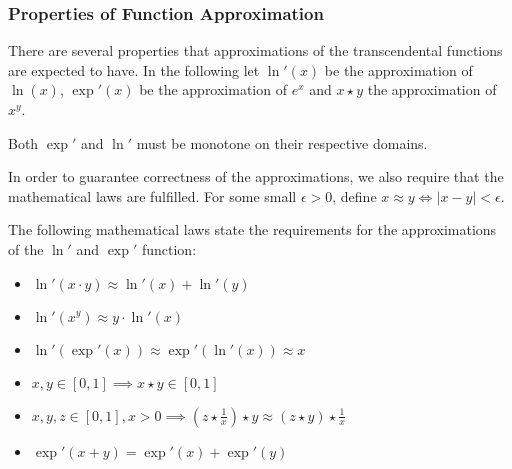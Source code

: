 \subsubsection{Properties of Function Approximation}
\label{sec:prop-funct-appr-1}

There are several properties that approximations of the transcendental functions
are expected to have. In the following let $\ln'(x)$ be the approximation of
$\ln(x)$, $\exp'(x)$ be the approximation of $e^{x}$ and $x\star y$ the approximation
of $x^{y}$.

\begin{property}
  \label{prop:monotone}
  Both $\exp'$ and $\ln'$ must be monotone on their respective domains.
\end{property}

In order to guarantee correctness of the approximations, we also require that
the mathematical laws are fulfilled. For some small $\epsilon > 0$, define
$x \approx y \Leftrightarrow \lvert x - y\rvert < \epsilon$.

\begin{property}
  \label{prop:ln-laws}
  The following mathematical laws state the requirements for the approximations
  of the $\ln'$ and $\exp'$ function:
  \begin{itemize}
  \item $\ln'(x\cdot y) \approx \ln'(x) + \ln'(y)$
  \item $\ln'(x^{y}) \approx y\cdot \ln'(x)$
  \item $\ln'(\exp'(x)) \approx \exp'(\ln'(x)) \approx x$
  \item $x, y \in [0,1] \implies x \star y \in [0, 1]$
  \item $x, y, z \in [0,1], x > 0 \implies
    (z\star\frac{1}{x})\star y \approx (z\star y)\star\frac{1}{x}$
  \item $\exp'(x + y) = \exp'(x) + \exp'(y)$
  \end{itemize}
\end{property}

